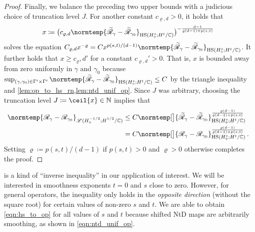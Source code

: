 \documentclass[pdflatex,sn-mathphys-num]{sn-jnl-preprint}
\newcommand{\N}{\mathbb{N}}
\newcommand{\C}{\mathbb{C}}
\newcommand{\sL}{\mathscr{L}}
\newcommand{\sR}{\mathscr{R}}
\newcommand{\ntd}{\mathscr{R}_{\gamma}}
\newcommand{\ntdz}{\mathscr{R}_{\gamma_0}}
\newcommand{\tntd}{\widetilde{\mathscr{R}}_{\gamma}}
\newcommand{\tntdz}{\widetilde{\mathscr{R}}_{\gamma_0}}
\newcommand{\norm}{\normtemp}
\newcommand{\defeq}{\coloneqq} %
\newcommand{\HS}{\mathrm{HS}} %
\theoremstyle{thmstyleone}%
\theoremstyle{thmstyletwo}%
\theoremstyle{thmstylethree}%
\numberwithin{equation}{section}
\numberwithin{theorem}{section}
\begin{document}
\begin{proof}
    Finally, we balance the preceding two upper bounds with a judicious choice of truncation level $J$. For another constant $c_{\varrho,d}>0$, it holds that
    \begin{align*}
        x \defeq \bigl(c_{\varrho,d} \norm{\tntd -\tntdz}_{\HS(H^{s}_\diamond;H^{t}/\C)}\bigr)^{-\frac{d-1}{\varrho(d-1) + p(s,t)}}
    \end{align*}
    solves the equation $C_{\varrho,d}x^{-\varrho} = C x^{p(s,t)/(d-1)}\norm{\tntd -\tntdz}_{\HS(H^{s}_\diamond;H^{t}/\C)}$. It further holds that $x\geq {c_\varrho,d}'$ for a constant $c_{\varrho,d}'>0$. That is, $x$ is bounded away from zero uniformly in $\gamma$ and $\gamma_0$ because $\sup_{(\gamma,\gamma_0)\in\Gamma'\times\Gamma'}\norm{\tntd -\tntdz}_{\HS(H^{s}_\diamond;H^{t}/\C)}\leq C$ by the triangle inequality and \cref{lem:op_to_hs_rn,lem:ntd_unif_op}. Since $J$ was arbitrary, choosing the truncation level $J\defeq \ceil{x} \in \N$ implies that
    \begin{align*}
        \norm{\ntd-\sR_{\gamma_0}}_{\sL(H_\diamond^{-1/2};H_{\phantom{\diamond}}^{1/2}/\C)}&\leq C \norm[\big]{\tntd -\tntdz}_{\HS(H^{s}_\diamond;H^{t}/\C)}^{\frac{\varrho(d-1)}{\varrho(d-1) + p(s,t)}}\\
        &= C \norm[\big]{\ntd -\ntdz}_{\HS(H^{s}_\diamond;H^{t}/\C)}^{\frac{\varrho(d-1)}{\varrho(d-1) + p(s,t)}}\,.
    \end{align*}
    Setting $\varrho\defeq p(s,t)/(d-1)$ if $p(s,t)>0$ and $\varrho>0$ otherwise completes the proof.
\end{proof}
 is a kind of ``inverse inequality'' in our application of interest. We will be interested in smoothness exponents $t=0$ and $s$ close to zero. However, for general operators, the inequality only holds in the \emph{opposite direction} (without the square root) for certain values of non-zero $s$ and $t$. We are able to obtain \eqref{eqn:hs_to_op} for all values of $s$ and $t$ because shifted NtD maps are arbitrarily smoothing, as shown in \eqref{eqn:ntd_unif_op}.
\end{document}
